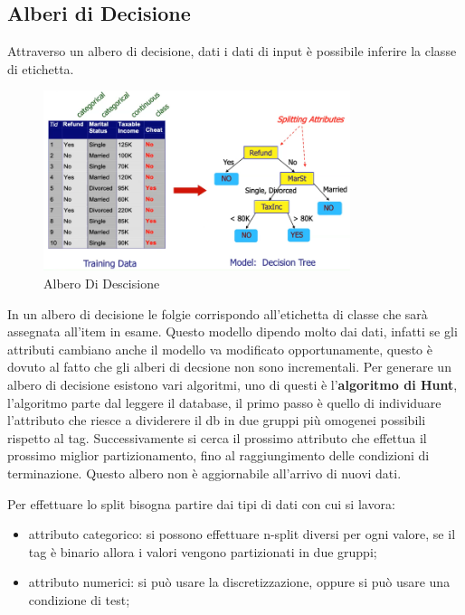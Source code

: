 \documentclass[12pt]{article}
\begin{document}
\subsection{Alberi di Decisione}
Attraverso un albero di decisione, dati i dati di input \`e possibile inferire la classe di etichetta.
\begin{figure}[H]
    \centering
    \includegraphics[width=0.8\textwidth]{albero-di-descisione.png}
    \caption{Albero Di Descisione}
    \label{fig:albero-di-descisione}
\end{figure}
In un albero di decisione le folgie corrispondo all'etichetta di classe che sar\`a assegnata all'item in esame. Questo modello dipendo molto dai dati, infatti se gli attributi cambiano anche il modello va modificato opportunamente, questo \`e dovuto al fatto che gli alberi di decsione non sono incrementali. Per generare un albero di decisione esistono vari algoritmi, uno di questi \`e l'\textbf{algoritmo di Hunt}, l'algoritmo parte dal leggere il database, il primo passo \`e quello di individuare l'attributo che riesce a dividerere il db in due gruppi pi\`u omogenei possibili rispetto al tag. Successivamente si cerca il prossimo attributo che effettua il prossimo miglior partizionamento, fino al raggiungimento delle condizioni di terminazione. Questo albero non \`e aggiornabile all'arrivo di nuovi dati.

Per effettuare lo split bisogna partire dai tipi di dati con cui si lavora:
\begin{itemize}
    \item attributo categorico: si possono effettuare n-split diversi per ogni valore, se il tag \`e binario allora i valori vengono partizionati in due gruppi;
    \item attributo numerici: si pu\`o usare la discretizzazione, oppure si pu\`o usare una condizione di test;
\end{itemize}
\end{document}
